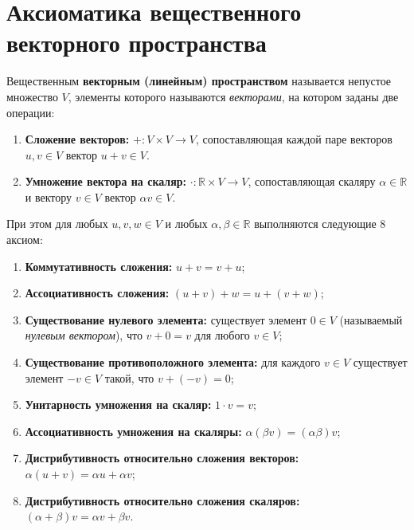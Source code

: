 \section{Аксиоматика вещественного векторного пространства}

\begin{definition}
Вещественным \textbf{векторным (линейным) пространством} называется непустое множество $V$, элементы которого называются
\emph{векторами}, на котором заданы две операции:
\begin{enumerate}
    \item \textbf{Сложение векторов:} $+ \colon V \times V \to V$, сопоставляющая каждой паре векторов $u, v \in V$
    вектор $u + v \in V$.
    \item \textbf{Умножение вектора на скаляр:} $\cdot \colon \mathbb{R} \times V \to V$, сопоставляющая скаляру
    $\alpha \in \mathbb{R}$ и вектору $v \in V$ вектор $\alpha v \in V$.
\end{enumerate}
При этом для любых $u, v, w \in V$ и любых $\alpha, \beta \in \mathbb{R}$ выполняются следующие 8 аксиом:
\begin{enumerate}
    \item \textbf{Коммутативность сложения:} $u + v = v + u$;
    \item \textbf{Ассоциативность сложения:} $(u + v) + w = u + (v + w)$;
    \item \textbf{Существование нулевого элемента:} существует элемент $0 \in V$ (называемый \emph{нулевым вектором}),
    что $v + 0 = v$ для любого $v \in V$;
    \item \textbf{Существование противоположного элемента:} для каждого $v \in V$ существует элемент $-v \in V$
    такой, что $v + (-v) = 0$;
    \item \textbf{Унитарность умножения на скаляр:} $1 \cdot v = v$;
    \item \textbf{Ассоциативность умножения на скаляры:} $\alpha (\beta v) = (\alpha \beta) v$;
    \item \textbf{Дистрибутивность относительно сложения векторов:} $\alpha (u + v) = \alpha u + \alpha v$;
    \item \textbf{Дистрибутивность относительно сложения скаляров:} $(\alpha + \beta) v = \alpha v + \beta v$.
\end{enumerate}
\end{definition}

